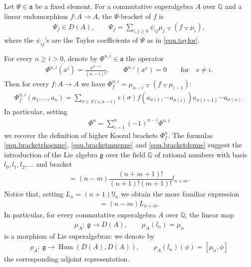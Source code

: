 \documentclass[11pt]{article}
\newcommand{\wedgebar}{\barwedge}
\newcommand{\Hom}{\operatorname{Hom}}
\newcommand{\Q}{\mathbb{Q}}
\numberwithin{equation}{section}
\begin{document}
\begin{Definition} Let $\Psi\in \mathfrak{a}$ be a f\/ixed element.
For a commutative superalgebra $A$ over $\Q$ and a linear endomorphism $f\colon A\to A$,
the $\Psi$-bracket of $f$ is
\begin{gather*} \Psi_f\in D(A),\qquad
\Psi_f=\sum_{i,j\ge 0}\psi_{ij} \mu_j\wedgebar (f\wedgebar\mu_i),
\end{gather*}
where the $\psi_{ij}$'s are the Taylor coef\/f\/icients of $\Psi$ as in \eqref{equ.taylor}.
\end{Definition}

For every $n\ge i>0$, denote by $\Phi^{n,i}\in \mathfrak{a}$ the operator
\begin{gather*} \Phi^{n,i}(x^{i})=\frac{x^{n-i}}{(n-i)!} ,\qquad \Phi^{n,i}(x^s)=0\qquad \text{for}\quad s\not=i.\end{gather*}
Then for every $f\colon A\to A$ we have $\Phi^{n,i}_f=\mu_{n-i}\wedgebar (f\wedgebar\mu_{i-1})$:
\begin{gather*}\Phi^{n,i}_f(a_1,\ldots,a_{n})=\sum_{\sigma\in S(i,n-i)}\epsilon(\sigma)
f(a_{\sigma(1)}\cdots a_{\sigma(i)})a_{\sigma(i+1)}\cdots a_{\sigma(n)}.\end{gather*}
In particular, setting
\begin{gather*} \Phi^n=\sum_{i=1}^n(-1)^{n-i}\Phi^{n,i}\end{gather*}
we recover the def\/inition of higher Koszul brackets $\Phi^n_f$.
The formulas \eqref{equ.bracketrhoenne}, \eqref{equ.bracketmuenne} and \eqref{equ.bracketdenne} suggest the introduction of the Lie algebra
$\mathfrak{g}$ over the f\/ield $\Q$ of rational numbers with basis $l_0,l_1,l_2,\ldots$ and bracket
\begin{gather*}[l_n,l_m]=(n-m)\dfrac{(n+m+1)!}{(n+1)!(m+1)!}l_{n+m}.\end{gather*}
Notice that, setting $L_n=(n+1)! l_n$ we obtain the more familiar expression
\begin{gather*}[L_n,L_m]=(n-m)L_{n+m}.\end{gather*}
In particular, for every commutative superalgebra $A$ over $\Q$, the linear map
\begin{gather*} \mu_A\colon \ \mathfrak{g}\to D(A),\qquad \mu_A(l_n)=\mu_n\end{gather*}
is a morphism of Lie superalgebras: we denote by
\begin{gather*} \rho_A\colon \ \mathfrak{g}\to \Hom(D(A),D(A)),\qquad \rho_A(l_n)(\phi)=[\mu_n,\phi]\end{gather*}
the corresponding adjoint representation.
\end{document}
